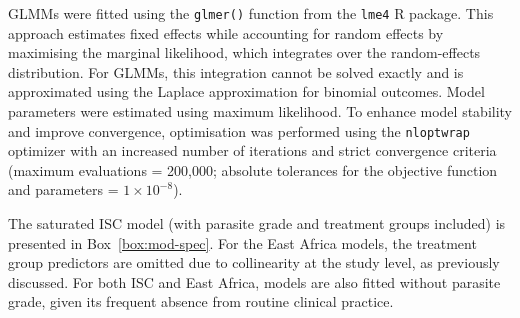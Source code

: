 GLMMs were fitted using the \texttt{glmer()} function from the \texttt{lme4} R package\cite{bates2015}. This approach estimates fixed effects while accounting for random effects by maximising the marginal likelihood, which integrates over the random-effects distribution. For GLMMs, this integration cannot be solved exactly and is approximated using the Laplace approximation for binomial outcomes. Model parameters were estimated using maximum likelihood. To enhance model stability and improve convergence, optimisation was performed using the \texttt{nloptwrap} optimizer with an increased number of iterations and strict convergence criteria (maximum evaluations = 200,000; absolute tolerances for the objective function and parameters = $1\times10^{-8}$).

The saturated ISC model (with parasite grade and treatment groups included) is presented in Box~\ref{box:mod-spec}. For the East Africa models, the treatment group predictors are omitted due to collinearity at the study level, as previously discussed. For both ISC and East Africa, models are also fitted without parasite grade, given its frequent absence from routine clinical practice.

